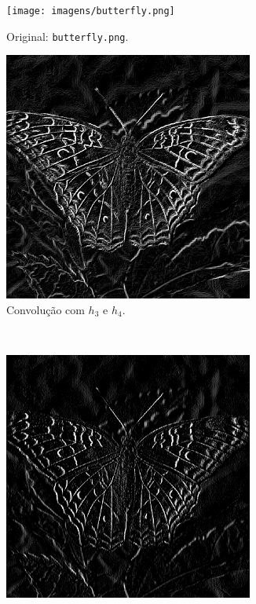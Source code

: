 \begin{figure}[H]
    \centering
    \begin{subfigure}{0.48\textwidth}
        \centering
        \texttt{[image: imagens/butterfly.png]}
        \caption{Original: \texttt{butterfly.png}.}
        \label{fig:sobel:orig}
    \end{subfigure}%
    \begin{subfigure}{0.48\textwidth}
        \centering
        \includegraphics[width=0.9\textwidth]{resultados/butterfly_h3h4.png}
        \caption{Convolução com $h_3$ e $h_4$.}
        \label{fig:sobel:abs}
    \end{subfigure}\\[8pt]
    \begin{subfigure}{0.48\textwidth}
        \centering
        \includegraphics[width=0.9\textwidth]{resultados/butterfly_h3.png}

\end{subfigure}
\end{figure}
